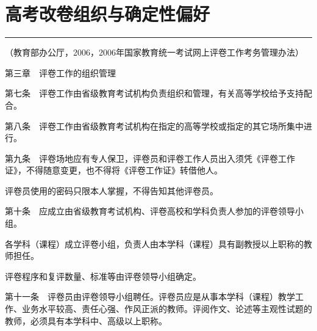 \documentclass[12pt,a4paper]{article}
\begin{document}
\section{高考改卷组织与确定性偏好}
\vspace{0.5em}
\vspace{0.3em}

\noindent\rule{\textwidth}{0.4pt}

\vspace{0.3em}

{\color{gray}\small （教育部办公厅，2006，2006年国家教育统一考试网上评卷工作考务管理办法）}



第三章　评卷工作的组织管理



第七条　评卷工作由省级教育考试机构负责组织和管理，有关高等学校给予支持配合。



第八条　评卷工作由省级教育考试机构在指定的高等学校或指定的其它场所集中进行。



第九条　评卷场地应有专人保卫，评卷员和评卷工作人员出入须凭《评卷工作证》，不得随意变更，也不得将《评卷工作证》转借他人。



评卷员使用的密码只限本人掌握，不得告知其他评卷员。



第十条　应成立由省级教育考试机构、评卷高校和学科负责人参加的评卷领导小组。



各学科（课程）成立评卷小组，负责人由本学科（课程）具有副教授以上职称的教师担任。



评卷程序和复评数量、标准等由评卷领导小组确定。



第十一条　评卷员由评卷领导小组聘任。评卷员应是从事本学科（课程）教学工作、业务水平较高、责任心强、作风正派的教师。评阅作文、论述等主观性试题的教师，必须具有本学科中、高级以上职称。
\end{document}
